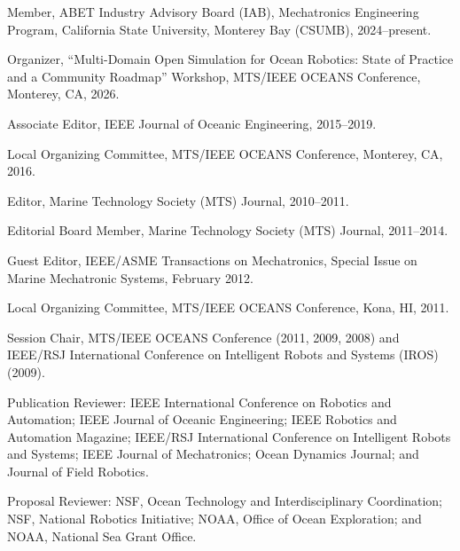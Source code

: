 
\begin{cvitems}
  \item Member, ABET Industry Advisory Board (IAB), Mechatronics Engineering Program, California State University, Monterey Bay (CSUMB), 2024--present.
  \item Organizer, ``Multi-Domain Open Simulation for Ocean Robotics: State of Practice and a Community Roadmap'' Workshop, MTS/IEEE OCEANS Conference, Monterey, CA, 2026.
  \item Associate Editor, IEEE Journal of Oceanic Engineering, 2015--2019.
  \item Local Organizing Committee, MTS/IEEE OCEANS Conference, Monterey, CA, 2016.
  \item Editor, Marine Technology Society (MTS) Journal, 2010--2011.
  \item Editorial Board Member, Marine Technology Society (MTS) Journal, 2011--2014.
  \item Guest Editor, IEEE/ASME Transactions on Mechatronics, Special Issue on Marine Mechatronic Systems, February 2012.
  \item Local Organizing Committee, MTS/IEEE OCEANS Conference, Kona, HI, 2011.
  \item Session Chair, MTS/IEEE OCEANS Conference (2011, 2009, 2008) and IEEE/RSJ International Conference on Intelligent Robots and Systems (IROS) (2009).
  \item Publication Reviewer: IEEE International Conference on Robotics and Automation; IEEE Journal of Oceanic Engineering; IEEE Robotics and Automation Magazine; IEEE/RSJ International Conference on Intelligent Robots and Systems; IEEE Journal of Mechatronics; Ocean Dynamics Journal; and Journal of Field Robotics.
  \item Proposal Reviewer: NSF, Ocean Technology and Interdisciplinary Coordination; NSF, National Robotics Initiative; NOAA, Office of Ocean Exploration; and NOAA, National Sea Grant Office.
\end{cvitems}
